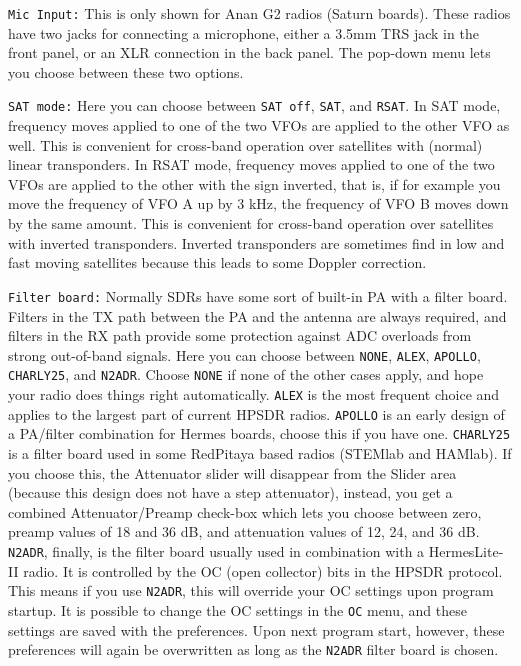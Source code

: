 \documentclass[12pt]{book}
\def\rett#1{\texttt{\color{red}#1}}
\def\bltt#1{\texttt{\color{blue}#1}}
\begin{document}
\rett{Mic Input:} This is only shown for Anan G2 radios (Saturn boards).
These radios have two jacks for connecting a
microphone, either a 3.5mm TRS jack in the front panel, or an XLR connection in the back panel. The pop-down
menu lets you choose between these two options.

\rett{SAT mode:} Here you can choose between \texttt{SAT off}, \texttt{SAT}, and \texttt{RSAT}. In SAT mode,
frequency moves applied to one of the two VFOs are applied to the other VFO as well. This is convenient
for cross-band operation over satellites with (normal) linear transponders. In RSAT mode, frequency
moves applied to one of the two VFOs are applied to the other with the sign inverted, that is, if
for example you move the frequency of VFO A up by 3 kHz, the frequency of VFO B moves down by the same
amount. This is convenient for cross-band operation over satellites with inverted transponders. Inverted
transponders are sometimes find in low and fast moving satellites because this leads to some Doppler
correction.

\rett{Filter board:} Normally SDRs have some sort of built-in PA with a filter board. Filters in the TX path
between the PA and the antenna are always required, and filters in the RX path provide some protection
against ADC overloads from strong out-of-band signals. Here you can choose between \texttt{NONE},
\texttt{ALEX},
\texttt{APOLLO}, \texttt{CHARLY25}, and \texttt{N2ADR}. Choose \texttt{NONE} if none of the other cases
apply, and hope your radio does things right automatically. \texttt{ALEX} is the most frequent choice
and applies to the largest part of current HPSDR radios. \texttt{APOLLO} is an early design of a
PA/filter combination for Hermes boards, choose this if you have one. \texttt{CHARLY25} is a filter board
used in some RedPitaya based radios (STEMlab and HAMlab). If you choose this, the Attenuator slider will
disappear from the Slider area (because this design does not have a step attenuator), instead, you get
a combined Attenuator/Preamp check-box which lets you choose between zero, preamp values of 18 and 36 dB,
and attenuation values of 12, 24, and 36 dB. \texttt{N2ADR}, finally, is the filter board usually used
in combination with a HermesLite-II radio. It is controlled by the OC (open collector) bits in the HPSDR
protocol. This means if you use \texttt{N2ADR}, this will override your OC settings upon program startup.
It is possible to change the OC settings in the \bltt{OC} menu, and these settings are saved with the
preferences. Upon next program start, however, these preferences will again be overwritten as long
as the \texttt{N2ADR} filter board is chosen.
\end{document}
